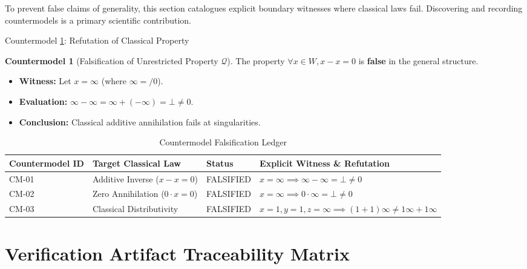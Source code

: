 \documentclass[11pt,a4paper]{article}
\theoremstyle{plain}
\theoremstyle{definition}
\newtheorem{countermodel}[theorem]{Countermodel}
\theoremstyle{remark}
\begin{document}
To prevent false claims of generality, this section catalogues explicit boundary witnesses where classical laws fail. Discovering and recording countermodels is a primary scientific contribution.

\begin{counterbox}{Countermodel \ref{cm:sample-counter}: Refutation of Classical Property}
\begin{countermodel}[Falsification of Unrestricted Property $\mathcal{Q}$]
\label{cm:sample-counter}
The property $\forall x \in W, x - x = 0$ is \textbf{false} in the general structure.
\begin{itemize}
    \item \textbf{Witness:} Let $x = \infty$ (where $\infty = /0$).
    \item \textbf{Evaluation:} $\infty - \infty = \infty + (-\infty) = \bot \neq 0$.
    \item \textbf{Conclusion:} Classical additive annihilation fails at singularities.
\end{itemize}
\end{countermodel}
\end{counterbox}

\begin{table}[htbp]
\centering
\small
\caption{Countermodel Falsification Ledger}
\label{tab:countermodels}
\begin{tabularx}{\textwidth}{llXX}
\toprule
\textbf{Countermodel ID} & \textbf{Target Classical Law} & \textbf{Status} & \textbf{Explicit Witness \& Refutation} \\
\midrule
CM-01 & Additive Inverse ($x-x=0$) & FALSIFIED & $x=\infty \implies \infty-\infty = \bot \neq 0$ \\
CM-02 & Zero Annihilation ($0 \cdot x = 0$) & FALSIFIED & $x=\infty \implies 0 \cdot \infty = \bot \neq 0$ \\
CM-03 & Classical Distributivity & FALSIFIED & $x=1, y=1, z=\infty \implies (1+1)\infty \neq 1\infty + 1\infty$ \\
\bottomrule
\end{tabularx}
\end{table}

\section{Verification Artifact Traceability Matrix}
\label{sec:traceability}
\end{document}
